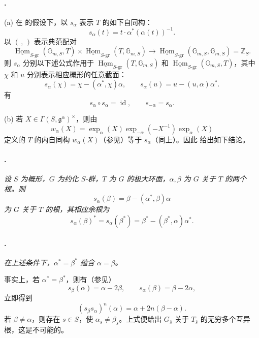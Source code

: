 \paragraph{.}
\textup{(a)} 在  的假设下，以 \(s_\alpha\) 表示 \(T\) 的如下自同构：
\[
  s_\alpha(t)=t\mathbin{\cdot}\alpha^*(\alpha(t))^{-1}.
\]
以 \((\, ,\,)\) 表示典范配对
\[
  \underline{\operatorname{Hom}}_{S\text{-gr}}
    (\mathbb G_{m,S},T)
  \times
  \underline{\operatorname{Hom}}_{S\text{-gr}}
    (T,\mathbb G_{m,S})
  \longrightarrow
  \underline{\operatorname{Hom}}_{S\text{-gr}}
    (\mathbb G_{m,S},\mathbb G_{m,S})
  =\mathbb Z_S.
\]
则 \(s_\alpha\) 分别以下述公式作用于
\(\underline{\operatorname{Hom}}_{S\text{-gr}}(T,\mathbb G_{m,S})\) 和
\(\underline{\operatorname{Hom}}_{S\text{-gr}}(\mathbb G_{m,S},T)\)，其中 \(\chi\) 和 \(u\) 分别表示相应概形的任意截面：
\[
  s_\alpha(\chi)=\chi-(\alpha^*,\chi)\alpha,
  \qquad
  s_\alpha(u)=u-(u,\alpha)\alpha^*.
\]
有
\[
  s_\alpha\circ s_\alpha=\operatorname{id},
  \qquad
  s_{-\alpha}=s_\alpha.
\]

\textup{(b)} 若
\(X\in\Gamma(S,\mathfrak g^\alpha)^\times\)，则由
\[
  w_\alpha(X)
  =
  \exp_\alpha(X)\exp_{-\alpha}(-X^{-1})\exp_\alpha(X)
\]
定义的 \(T\) 的内自同构 \(w_\alpha(X)\)（参见）等于 \(s_\alpha\)（同上）。因此 给出如下结论。

\paragraph{.}
\textit{设 \(S\) 为概形，\(G\) 为约化 \(S\)-群，\(T\) 为 \(G\) 的极大环面，\(\alpha,\beta\) 为 \(G\) 关于 \(T\) 的两个根。则}
\[
  s_\alpha(\beta)=\beta-(\alpha^*,\beta)\alpha
\]
\textit{为 \(G\) 关于 \(T\) 的根，其相应余根为}
\[
  s_\alpha(\beta)^*
  =
  s_\alpha(\beta^*)
  =
  \beta^*-(\beta^*,\alpha)\alpha^*.
\]

\paragraph{.}
\textit{在上述条件下，\(\alpha^*=\beta^*\) 蕴含 \(\alpha=\beta\)。}

事实上，若 \(\alpha^*=\beta^*\)，则有（参见）
\[
  s_\beta(\alpha)=\alpha-2\beta,
  \qquad
  s_\alpha(\beta)=\beta-2\alpha,
\]
立即得到
\[
  (s_\beta s_\alpha)^n(\alpha)
  =
  \alpha+2n(\beta-\alpha).
\]
若 \(\beta\ne\alpha\)，则存在 \(s\in S\)，使 \(\alpha_s\ne\beta_s\)。上式便给出 \(G_{\bar s}\) 关于 \(T_{\bar s}\) 的无穷多个互异根，这是不可能的。

